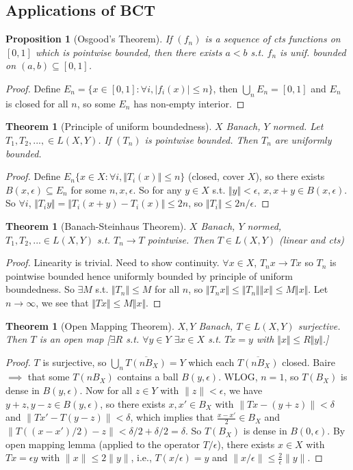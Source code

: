 \documentclass{article}
\theoremstyle{definition}
\theoremstyle{remark}
\theoremstyle{plain}
\newtheorem{thm}[defn]{Theorem}
\newtheorem{prop}[defn]{Proposition}
\begin{document}
\subsection{Applications of BCT}
\begin{prop}[Osgood's Theorem]
    If $(f_n)$ is a sequence of cts functions on $[0,1]$ which is pointwise bounded, then there exists $a<b$ s.t. $f_n$ is unif. bounded on $(a,b)\subseteq[0,1]$.
\end{prop}
\begin{proof}
    Define $E_n=\{x\in[0,1]:\forall i, |f_i(x)|\le n\}$, then $\bigcup_nE_n=[0,1]$ and $E_n$ is closed for all $n$, so some $E_n$ has non-empty interior.
\end{proof}
\begin{thm}[Principle of uniform boundedness]
$X$ Banach, $Y$ normed. Let $T_1,T_2,...,\in L(X,Y)$. If $(T_n)$ is pointwise bounded. Then $T_n$ are uniformly bounded.    
\end{thm}
\begin{proof}
    Define $E_n\{x\in X:\forall i,\Vert T_i(x)\Vert\le n\}$ (closed, cover $X$), so there exists $B(x,\epsilon)\subseteq E_n$ for some $n,x,\epsilon$. So for any $y\in X$ s.t. $\Vert y\Vert<\epsilon$, $x,x+y\in B(x,\epsilon)$. So $\forall i$, $\Vert T_iy\Vert=\Vert T_i(x+y)-T_i(x)\Vert\le 2n$, so $\Vert T_i\Vert\le 2n/\epsilon$.
\end{proof}
\begin{thm}[Banach-Steinhaus Theorem]
    $X$ Banach, $Y$ normed, $T_1,T_2,...\in L(X,Y)$ s.t. $T_n\to T$ pointwise. Then $T\in L(X,Y)$ (linear and cts)
\end{thm}
\begin{proof}
    Linearity is trivial. Need to show continuity.
    $\forall x\in X$, $T_nx\to Tx$ so $T_n$ is pointwise bounded hence uniformly bounded by principle of uniform boundedness. So $\exists M$ s.t. $\Vert T_n\Vert\le M$ for all $n$, so $\Vert T_nx\Vert\le\Vert T_n\Vert \Vert x\Vert\le M\Vert x\Vert$. Let $n\to\infty$, we see that $\Vert Tx\Vert\le M\Vert x\Vert$.
\end{proof}
\begin{thm}[Open Mapping Theorem]
    $X,Y$ Banach, $T\in L(X,Y)$ surjective. Then $T$ is an open map [$\exists R$ s.t. $\forall y\in Y$ $\exists x\in X$ s.t. $Tx=y$ with $\Vert x\Vert \le R\Vert y\Vert$.]
\end{thm}
\begin{proof}
    $T$ is surjective, so $\bigcup_n\overline{T(nB_X)}=Y$ which each $\overline{T(nB_X)}$ closed. Baire $\implies$ that some $T(nB_X)$ contains a ball $B(y,\epsilon)$. WLOG, $n=1$, so $T(B_X)$ is dense in $B(y,\epsilon)$. Now for all $z\in Y$ with $\|z\|<\epsilon$, we have $y+z,y-z\in B(y,\epsilon)$, so there exists $x,x'\in B_X$ with $\| Tx-(y+z)\|<\delta$ and $\|Tx'-T(y-z)\|<\delta$, which implies that $\frac{x-x'}{2}\in B_X$ and $\| T((x-x')/2)-z\|<\delta/2+\delta/2=\delta$. So $T(B_X)$ is dense in $B(0,\epsilon)$. By open mapping lemma (applied to the operator $T/\epsilon$), there exists $x\in X$ with $Tx=\epsilon y$ with $\|x\|\le 2\|y\|$, i.e., $T(x/\epsilon)=y$ and $\|x/\epsilon\|\le \frac{2}{\epsilon}\|y\|$.
\end{proof}
\end{document}
